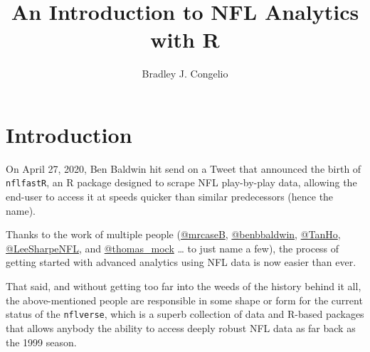 \documentclass[
  letterpaper,
]{krantz}
\title{An Introduction to NFL Analytics with R}
\author{Bradley J. Congelio}
\date{}
\renewcommand*\contentsname{Table of contents}
\newcommand\contentsname{Table of contents}
\begin{document}
\maketitle
\ifdefined\Shaded\renewenvironment{Shaded}{\begin{tcolorbox}[boxrule=0pt, interior hidden, breakable, borderline west={3pt}{0pt}{shadecolor}, enhanced, sharp corners, frame hidden]}{\end{tcolorbox}}\fi

\renewcommand*\contentsname{Table of contents}
{
\hypersetup{linkcolor=}
\setcounter{tocdepth}{2}
\tableofcontents
}

\hypertarget{introduction}{%
\chapter{Introduction}\label{introduction}}

On April 27, 2020, Ben Baldwin hit send on a Tweet that announced the
birth of \texttt{nflfastR}, an R package designed to scrape NFL
play-by-play data, allowing the end-user to access it at speeds quicker
than similar predecessors (hence the name).

Thanks to the work of multiple people
(\href{https://twitter.com/mrcaseb}{@mrcaseB},
\href{https://twitter.com/benbbaldwin}{@benbbaldwin},
\href{https://twitter.com/_TanHo}{@TanHo},
\href{https://twitter.com/LeeSharpeNFL}{@LeeSharpeNFL}, and
\href{https://twitter.com/thomas_mock}{@thomas\_mock} \ldots{} to just
name a few), the process of getting started with advanced analytics
using NFL data is now easier than ever.

That said, and without getting too far into the weeds of the history
behind it all, the above-mentioned people are responsible in some shape
or form for the current status of the \texttt{nflverse}, which is a
superb collection of data and R-based packages that allows anybody the
ability to access deeply robust NFL data as far back as the 1999 season.
\end{document}
